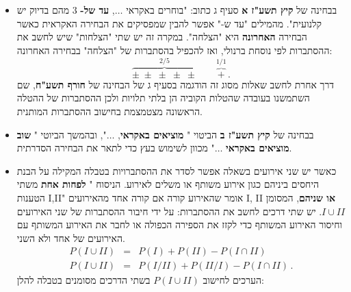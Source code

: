\documentclass[12pt,a4paper]{article}
\newcommand{\bover}[1]{\bm{\overline{#1}}}
\begin{document}
\begin{itemize}
\item
 בבחינה של
\textbf{קיץ תשע"ז א}
סעיף ג כתוב: "בוחרים באקראי
$\ldots$,
\textbf{עד של-}
$3$
מהם בדיוק יש קלנועית". מהמילים "עד ש-" אפשר להבין שמפסיקים את הבחירה האקראית כאשר הבחירה 
\textbf{האחרונה} 
היא "הצלחה". במקרה זה יש שתי "הצלחות" שיש לחשב את ההסתברות לפי נוסחת ברנולי, ואז להכפיל בהסתברות של "הצלחה" בבחירה האחרונה:
\[
\overbrace{\pm\;\pm\;\pm\;\pm\;\pm}^{2/5}\quad\quad \overbrace{+}^{1/1}\,.
\]
דרך אחרת לחשב שאלות מסוג זה הודגמה בסעיף ג של הבחינה של
\textbf{חורף תשע"ח},
שם השתמשנו בעובדה שהטלות הקוביה הן בלתי תלויות ולכן ההסתברות של ההטלה הראשונה מצטמצמת בחישוב ההסתברות המותנית.
\item
בבחינה של
\textbf{קיץ תשע"ז ב}
הביטוי "%
\textbf{מוציאים באקראי},
$\ldots$",
ובהמשך הביוטי "%
\textbf{שוב מוציאים באקראי}
$\ldots$"
מכוון לשימוש בעץ כדי לתאר את הבחירה הסדרתית.

\item
כאשר יש שני אירועים בשאלה אפשר לסדר את ההסתברויות בטבלה המקילה על הבנת היחסים ביניהם כגון אירוע משותף או משלים לאירוע. הניסוח "%
\textbf{לפחות אחת}
משתי הטענות I,II" אומר שהאירוע קורה אם קורה אחד מהאירועים I, II
\textbf{או שניהם},
המסומן 
$I \cup II$.
יש שתי דרכים לחשב את ההסתברות: על ידי חיבור ההסתברות של שני האירועים וחיסור האירוע המשותף כדי לקזז את הספירה הכפולה או לחבר את האירוע המשותף עם האירועים של אחד ולא השני.
\begin{eqnarray*}
P(I \cup II) &=& P(I) + P(II) - P(I \cap II)\\
P(I \cup II) &=& P(I/ II) + P(II/ I) - P(I \cap II)\,.
\end{eqnarray*}
הערכים לחישוב
$P(I \cup II)$
בשתי הדרכים מסומנים בטבלה להלן:
\begin{center}
\end{center}


\end{itemize}
\end{document}
